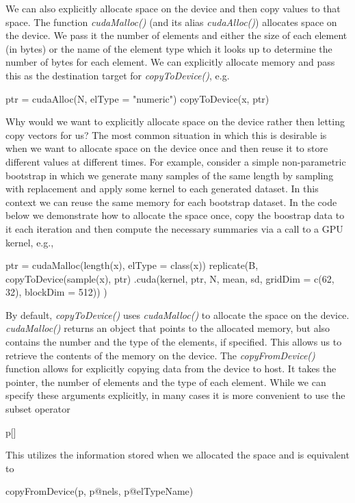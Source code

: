 \documentclass[article]{jss}
\def\R{\proglang{R}}
\def\Rfunc#1{\textsl{#1()}}
\begin{document}
We can also explicitly allocate space on the device and then copy
values to that space.  The function \Rfunc{cudaMalloc} (and its alias
\Rfunc{cudaAlloc}) allocates space on the device.  We pass it the
number of elements and either the size of each element (in bytes) or
the name of the element type which it looks up to determine the number
of bytes for each element.  We can explicitly allocate memory and pass
this as the destination target for \Rfunc{copyToDevice}, e.g.
\begin{RCode}
ptr = cudaAlloc(N, elType = "numeric")
copyToDevice(x, ptr)
\end{RCode}


Why would we want to explicitly allocate space on the device rather
then letting \R{} copy vectors for us?  The most common situation in
which this is desirable is when we want to allocate space on the 
device once and then reuse it to store different values at different
times. For example, consider a simple non-parametric bootstrap in which we
generate many samples of the same length by sampling with replacement
and apply some kernel to each generated dataset. In this context we can
reuse the same memory for each bootstrap dataset. In the code below we 
demonstrate how to allocate the space once, copy the boostrap data to it
each iteration and then compute the necessary summaries via a call
to a GPU kernel, e.g.,
\begin{RCode}
ptr = cudaMalloc(length(x), elType = class(x))
replicate(B, {
      copyToDevice(sample(x), ptr)
      .cuda(kernel, ptr, N, mean, sd, gridDim = c(62, 32), blockDim = 512))
})
\end{RCode}

By default, \Rfunc{copyToDevice} uses \Rfunc{cudaMalloc} to allocate
the space on the device.  \Rfunc{cudaMalloc} returns an object that
points to the allocated memory, but also contains the number and the
type of the elements, if specified.  This allows us to retrieve the
contents of the memory on the device.  The \Rfunc{copyFromDevice}
function allows for explicitly copying data from the device to host.
It takes the pointer, the number of elements and
the type of each element. While we can specify these arguments explicitly,
in many cases it is more convenient to use the subset operator
\begin{RCode}
p[]
\end{RCode}
This utilizes the information stored when we allocated the space and
is equivalent to 
\begin{RCode}
copyFromDevice(p, p@nels, p@elTypeName)
\end{RCode}
\end{document}
